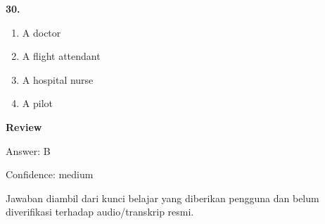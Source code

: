 \documentclass[12pt]{article}
\begin{document}
\noindent\textbf{30.}
\begin{enumerate}[label=(\Alph*),leftmargin=*,itemsep=0.2em]
\item A doctor
\item A flight attendant
\item A hospital nurse
\item A pilot
\end{enumerate}
\par
\begingroup
\setlength{\parskip}{0pt}
\setlength{\parindent}{0pt}
\textbf{Review}\par
Answer: B\par
Confidence: medium\par
Jawaban diambil dari kunci belajar yang diberikan pengguna dan belum diverifikasi terhadap audio/transkrip resmi.\par
\endgroup
\par
\vspace{0.25\baselineskip}
\end{document}
